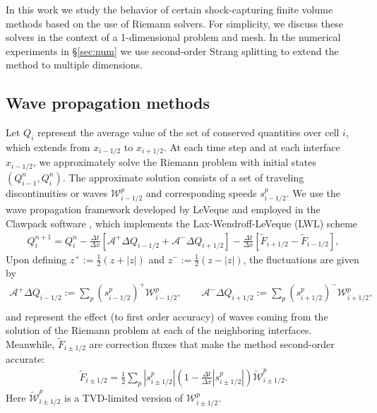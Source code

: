 \documentclass[preprint, 11pt]{article}
\newcommand{\W}{{\mathcal W}}
\newcommand{\A}{{\mathcal A}}
\newcommand{\apdq}{\A^+ \!\!{\Delta} Q}
\newcommand{\amdq}{\A^- \!\!{\Delta} Q}
\newcommand{\Ft}{\tilde{F}}
\newcommand{\imh}{{i-1/2}}
\newcommand{\iph}{{i+1/2}}
\begin{document}
In this work we study the behavior of certain shock-capturing finite volume
methods based on the use of Riemann solvers.  For simplicity, we discuss these
solvers in the context of a 1-dimensional problem and mesh.  
In the numerical experiments in \S\ref{sec:num} we use second-order Strang
splitting \cite{strang1968construction} to extend the method to multiple dimensions.

\subsection{Wave propagation methods}\label{sec:waveprop}
Let $Q_i$ represent the average value of the set of
conserved quantities over cell $i$, which extends from $x_\imh$ to $x_\iph$.
At each time step and at each interface $x_\imh$, we approximately solve the
Riemann problem with initial states $(Q^n_{i-1},Q^n_i)$.  The approximate
solution consists of a set of traveling discontinuities or waves $\W^p_\imh$
and corresponding speeds $s^p_\imh$.
We use the wave propagation framework developed by LeVeque \cite{leveque1997wave, leveque2002finite}
and employed in the Clawpack software \cite{clawpack,pyclaw-sisc}, which implements the 
Lax-Wendroff-LeVeque (LWL) scheme
\begin{align}\label{second-order_via_fluct}
  Q_i^{n+1} = Q_i^n-\frac{\Delta t}{\Delta x}\left[\apdq_\imh+\amdq_\iph\right]
  -\frac{\Delta t}{\Delta x}\left[\tilde{F}_{i+1/2}-\tilde{F}_{i-1/2}\right],
\end{align}
Upon defining $z^+:=\frac{1}{2}(z+|z|)$ and $z^-:=\frac{1}{2}(z-|z|)$,
the fluctuations are given by
\begin{align}\label{fluct}
  \apdq_\imh := \sum_p\left(s_{i-1/2}^p\right)^+\W_{i-1/2}^p, \qquad
  \amdq_\iph := \sum_p\left(s_{i+1/2}^p\right)^-\W_{i+1/2}^p, \\
\end{align}
and represent the effect (to first
order accuracy) of waves coming from the solution of the Riemann problem at
each of the neighboring interfaces.  Meanwhile, $\Ft_{i\pm 1/2}$ are correction
fluxes that make the method second-order accurate:
\begin{align}\label{correction-fluxes}
  \tilde{F}_{i\pm 1/2}=\frac{1}{2}\sum_p|s_{i\pm 1/2}^p|\left(1-\frac{\Delta t}{\Delta x}|s_{i\pm 1/2}^p|\right)\tilde\W_{i\pm 1/2}^p.
\end{align}
Here $\tilde{\W}_{i\pm 1/2}^p$ is a TVD-limited version of $\W_{i\pm 1/2}^p$.
\end{document}
